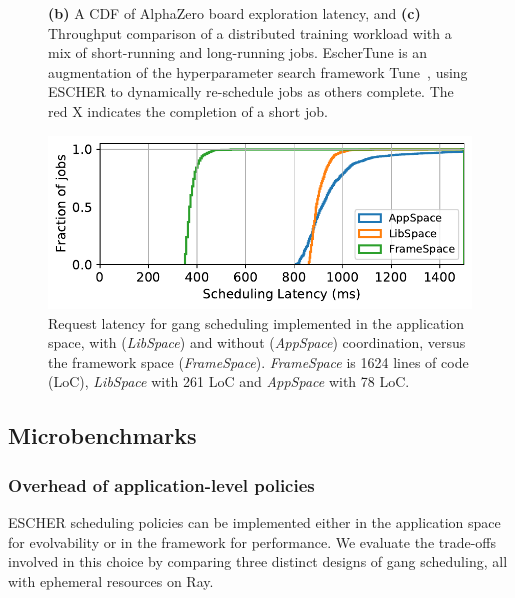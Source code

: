 \begin{figure}[t]
{%
\textbf{(b)} A CDF of AlphaZero board exploration latency, and
\textbf{(c)} Throughput comparison of a distributed training workload with a mix of short-running and long-running jobs. EscherTune is an augmentation of the hyperparameter search framework Tune~\cite{liaw2018tune}, using ESCHER to dynamically re-schedule jobs as others complete. %
The red X indicates the completion of a short job. %
}
\label{fig:alphazerolatencyfigure}
\vspace{-2mm}
\end{figure}


\begin{figure}[t]
\includegraphics[width=0.92\columnwidth]{escher/plots/result_gangsched_design_compare.pdf}
\caption{\small Request latency for gang scheduling implemented in the application space, with (\textit{LibSpace}) and without (\textit{AppSpace}) coordination, versus the framework space (\textit{FrameSpace}). \textit{FrameSpace} is 1624 lines of code (LoC), \textit{LibSpace} with 261 LoC and \textit{AppSpace} with 78 LoC.}
\label{fig:gangscheddesign-results}
\vspace{-1em}
\end{figure}

\subsection{Microbenchmarks}
\subsubsection{Overhead of application-level policies}
\label{sec:eval:gangscheduling}
ESCHER scheduling policies can be implemented either in the application space for evolvability or in the framework for performance.
We evaluate the trade-offs involved in this choice by comparing three distinct designs of gang scheduling, all with ephemeral resources on Ray.

